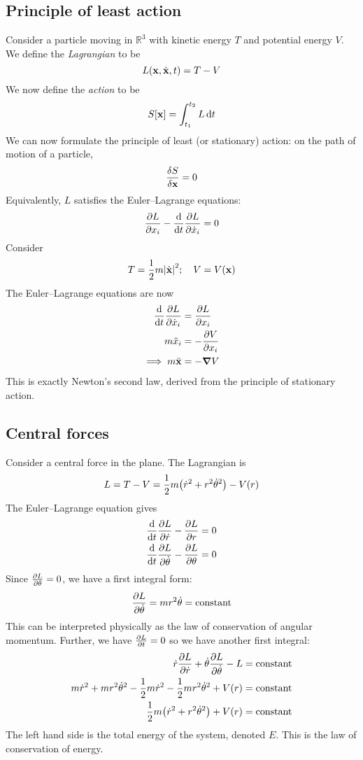 \subsection{Principle of least action}
Consider a particle moving in \( \mathbb R^3 \) with kinetic energy \( T \) and potential energy \( V \).
We define the \textit{Lagrangian} to be
\[
	L(\vb x, \dot {\vb x}, t) = T - V
\]
We now define the \textit{action} to be
\[
	S[\vb x] = \int_{t_1}^{t_2} L \dd{t}
\]
We can now formulate the principle of least (or stationary) action: on the path of motion of a particle,
\[
	\fdv{S}{\vb x} = 0
\]
Equivalently, \( L \) satisfies the Euler--Lagrange equations:
\[
	\pdv{L}{x_i} - \dv{t}\pdv{L}{\dot x_i} = 0
\]
Consider
\[
	T = \frac{1}{2}m\abs{\dot{\vb x}}^2;\quad V = V(\vb x)
\]
The Euler--Lagrange equations are now
\begin{align*}
	\dv{t}\pdv{L}{\dot x_i} & = \pdv{L}{x_i}  \\
	m \ddot x_i             & = -\pdv{V}{x_i} \\
	\implies m \ddot{\vb x} & = -\grad V
\end{align*}
This is exactly Newton's second law, derived from the principle of stationary action.

\subsection{Central forces}
\begin{example}
	Consider a central force in the plane.
	The Lagrangian is
	\[
		L = T - V = \frac{1}{2}m\qty(\dot r^2 + r^2 \dot \theta^2) - V(r)
	\]
	The Euler--Lagrange equation gives
	\begin{align*}
		\dv{t}\pdv{L}{\dot r} - \pdv{L}{r}           & = 0 \\
		\dv{t}\pdv{L}{\dot \theta} - \pdv{L}{\theta} & = 0
	\end{align*}
	Since \( \pdv{L}{\theta} = 0 \), we have a first integral form:
	\[
		\pdv{L}{\dot \theta} = mr^2 \dot \theta = \text{constant}
	\]
	This can be interpreted physically as the law of conservation of angular momentum.
	Further, we have \( \pdv{L}{t} = 0 \) so we have another first integral:
	\begin{align*}
		\dot r \pdv{L}{\dot r} + \dot\theta \pdv{L}{\dot\theta} - L                              & = \text{constant} \\
		m\dot r^2 + mr^2\dot\theta^2 - \frac{1}{2}m\dot r^2 - \frac{1}{2}mr^2\dot\theta^2 + V(r) & = \text{constant} \\
		\frac{1}{2} m \qty( \dot r^2 + r^2\dot\theta^2 ) + V(r)                                  & = \text{constant}
	\end{align*}
	The left hand side is the total energy of the system, denoted \( E \).
	This is the law of conservation of energy.
\end{example}

